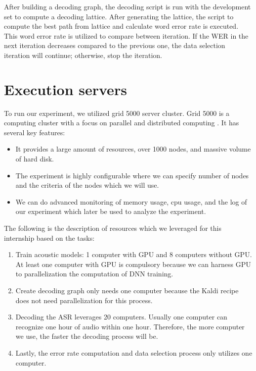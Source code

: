 After building a decoding graph, the decoding script is run with the development set to compute a decoding lattice. After generating the lattice, the script to compute the best path from lattice and calculate word error rate is executed. This word error rate is utilized to compare between iteration. If the WER in the next iteration decreases compared to the previous one, the data selection iteration will continue; otherwise, stop the iteration. 

\section{Execution servers}
To run our experiment, we utilized grid 5000 server cluster. Grid 5000 is a computing cluster with a focus on parallel and distributed computing \cite{Grid5000}. It has several key features:
\begin{itemize}
\item It provides a large amount of resources, over 1000 nodes, and massive volume of hard disk.
\item The experiment is highly configurable where we can specify number of nodes and the criteria of the nodes which we will use.
\item We can do advanced monitoring of memory usage, cpu usage, and the log of our experiment which later be used to analyze the experiment.
\end{itemize}

The following is the description of resources which we leveraged for this internship based on the tasks:
\begin{enumerate}
\item Train acoustic models: 1 computer with GPU and 8 computers without GPU. At least one computer with GPU is compulsory because we can harness GPU to parallelization the computation of DNN training. 
\item Create decoding graph only needs one computer because the Kaldi recipe does not need parallelization for this process.
\item Decoding the ASR leverages 20 computers. Usually one computer can recognize one hour of audio within one hour. Therefore, the more computer we use, the faster the decoding process will be. 
\item Lastly, the error rate computation and data selection process only utilizes one computer. 
\end{enumerate}

